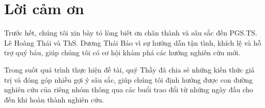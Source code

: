 \chapter*{Lời cảm ơn}
\label{thanks}
Trước hết, chúng tôi xin bày tỏ lòng biết ơn chân thành và sâu sắc đến PGS.TS. Lê Hoàng Thái và ThS. Dương Thái Bảo vì sự hướng dẫn tận tình, khích lệ và hỗ trợ quý báu, giúp chúng tôi có cơ hội khám phá các hướng nghiên cứu mới.

Trong suốt quá trình thực hiện đề tài, quý Thầy đã chia sẻ những kiến thức giá trị và đóng góp nhiều gợi ý sâu sắc, giúp chúng tôi định hướng được con đường nghiên cứu của riêng nhóm thông qua các buổi trao đổi từ những ngày đầu cho đến khi hoàn thành nghiên cứu.


